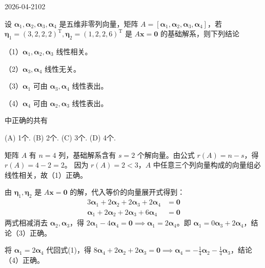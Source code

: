 \begin{mistake}{2026-04-21}{02}

\begin{problemcontent}
设 \(\boldsymbol{\alpha}_1, \boldsymbol{\alpha}_2, \boldsymbol{\alpha}_3, \boldsymbol{\alpha}_4\) 是五维非零列向量，矩阵 \(A=[\boldsymbol{\alpha}_1, \boldsymbol{\alpha}_2, \boldsymbol{\alpha}_3, \boldsymbol{\alpha}_4]\)，若 \(\boldsymbol{\eta}_1=(3,2,2,2)^\mathrm{T}, \boldsymbol{\eta}_2=(1,2,2,6)^\mathrm{T}\) 是 \(A\boldsymbol{x}=\boldsymbol{0}\) 的基础解系，则下列结论

（1）\(\boldsymbol{\alpha}_1, \boldsymbol{\alpha}_2, \boldsymbol{\alpha}_3\) 线性相关。

（2）\(\boldsymbol{\alpha}_3, \boldsymbol{\alpha}_4\) 线性无关。

（3）\(\boldsymbol{\alpha}_1\) 可由 \(\boldsymbol{\alpha}_3, \boldsymbol{\alpha}_4\) 线性表出。

（4）\(\boldsymbol{\alpha}_4\) 可由 \(\boldsymbol{\alpha}_2, \boldsymbol{\alpha}_3\) 线性表出。

中正确的共有

(A) 1个. \quad (B) 2个. \quad (C) 3个. \quad (D) 4个.
\end{problemcontent}

\begin{solutioncontent}
矩阵 \(A\) 有 \(n=4\) 列，基础解系含有 \(s=2\) 个解向量。由公式 \(r(A) = n - s\)，得 \(r(A) = 4 - 2 = 2\)。
因为 \(r(A)=2 < 3\)，\(A\) 中任意三个列向量构成的向量组必线性相关，故（1）正确。

由 \(\boldsymbol{\eta}_1, \boldsymbol{\eta}_2\) 是 \(A\boldsymbol{x}=\boldsymbol{0}\) 的解，代入等价的向量展开式得到：
\[
\begin{aligned}
3\boldsymbol{\alpha}_1 + 2\boldsymbol{\alpha}_2 + 2\boldsymbol{\alpha}_3 + 2\boldsymbol{\alpha}_4 &= \boldsymbol{0} \\
\boldsymbol{\alpha}_1 + 2\boldsymbol{\alpha}_2 + 2\boldsymbol{\alpha}_3 + 6\boldsymbol{\alpha}_4 &= \boldsymbol{0}
\end{aligned}
\]
两式相减消去 \(\boldsymbol{\alpha}_2, \boldsymbol{\alpha}_3\)，得 \(2\boldsymbol{\alpha}_1 - 4\boldsymbol{\alpha}_4 = \boldsymbol{0} \implies \boldsymbol{\alpha}_1 = 2\boldsymbol{\alpha}_4\)。即 \(\boldsymbol{\alpha}_1 = 0\boldsymbol{\alpha}_3 + 2\boldsymbol{\alpha}_4\)，结论（3）正确。

将 \(\boldsymbol{\alpha}_1 = 2\boldsymbol{\alpha}_4\) 代回式(1)，得 \(8\boldsymbol{\alpha}_4 + 2\boldsymbol{\alpha}_2 + 2\boldsymbol{\alpha}_3 = \boldsymbol{0} \implies \boldsymbol{\alpha}_4 = -\frac{1}{4}\boldsymbol{\alpha}_2 - \frac{1}{4}\boldsymbol{\alpha}_3\)，结论（4）正确。


\end{solutioncontent}
\end{mistake}
